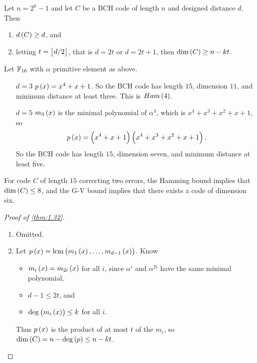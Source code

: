 \begin{theorem}
\label{thm:1.32}
Let $ n = 2^k - 1 $ and let $ C $ be a BCH code of length $ n $ and designed distance $ d $. Then
\begin{enumerate}
\item $ d\br{C} \ge d $, and
\item letting $ t = \left\lfloor d / 2 \right\rfloor $, that is $ d = 2t $ or $ d = 2t + 1 $, then $ \dim\br{C} \ge n - kt $.
\end{enumerate}
\end{theorem}

\begin{example*}
Let $ \mathbb{F}_{16} $ with $ \alpha $ primitive element as above.
\begin{itemize}
\item[$ d = 3 $] $ p\br{x} = x^4 + x + 1 $. So the BCH code has length $ 15 $, dimension $ 11 $, and minimum distance at least three. This is $ Ham\br{4} $.
\item[$ d = 5 $] $ m_3\br{x} $ is the minimal polynomial of $ \alpha^3 $, which is $ x^4 + x^3 + x^2 + x + 1 $, so
$$ p\br{x} = \br{x^4 + x + 1}\br{x^4 + x^3 + x^2 + x + 1}. $$
So the BCH code has length $ 15 $, dimension seven, and minimum distance at least five.
\end{itemize}
\end{example*}

\begin{note*}
For code $ C $ of length $ 15 $ correcting two errors, the Hamming bound implies that $ \dim\br{C} \le 8 $, and the G-V bound implies that there exists a code of dimension six.
\end{note*}

\begin{proof}[Proof of \ref{thm:1.32}]
\hfill
\begin{enumerate}
\item Omitted.
\item Let $ p\br{x} = \mathrm{lcm}\br{m_1\br{x}, \dots, m_{d - 1}\br{x}} $. Know
\begin{itemize}
\item $ m_i\br{x} = m_{2i}\br{x} $ for all $ i $, since $ \alpha^i $ and $ \alpha^{2i} $ have the same minimal polynomial,
\item $ d - 1 \le 2t $, and
\item $ \deg\br{m_i\br{x}} \le k $ for all $ i $.
\end{itemize}
Thus $ p\br{x} $ is the product of at most $ t $ of the $ m_i $, so $ \dim\br{C} = n - \deg\br{p} \le n - kt $.
\end{enumerate}
\end{proof}

